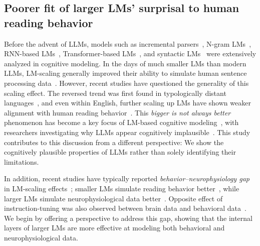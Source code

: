 \subsection{Poorer fit of larger LMs' surprisal to human reading behavior}
\label{subsec:llm_cog}
Before the advent of LLMs, models such as incremental parsers~\cite{Levy2008Expectation-basedComprehension}, N-gram LMs~\cite{Smith2013-ap}, RNN-based LMs~\cite{frank2011insensitivity,Aurnhammer2019-fu}, Transformer-based LMs~\cite{Merkx2020ComparingData}, and syntactic LMs~\cite{Hale2018FindingSearch,Yoshida2021-rc,Oh2021-ln,Oh2022-ss} were extensively analyzed in cognitive modeling. 
In the days of much smaller LMs than modern LLMs, LM-scaling generally improved their ability to simulate human sentence processing data~\cite{frank2011insensitivity,Goodkind2018PredictiveQuality,Wilcox2020OnBehavior,Wilcox2023-bb}. 
However, recent studies have questioned the generality of this scaling effect. 
The reversed trend was first found in typologically distant languages~\cite{kuribayashi-etal-2021-lower}, and even within English, further scaling up LMs have shown weaker alignment with human reading behavior~\cite{kuribayashi-etal-2022-context,Shain2022-qv,Oh2023-zw}. 
This \textit{bigger is not always better} phenomenon has become a key focus of LM-based cognitive modeling~\cite{Wilcox2024-qx}, with researchers investigating why LLMs appear cognitively implausible~\cite{kuribayashi-etal-2022-context,Oh2023-hj,Oh2023-zw,Oh2024-cc,nair2023words,kuribayashi-etal-2024-psychometric}.
This study contributes to this discussion from a different perspective: 
We show the cognitively plausible properties of LLMs rather than solely identifying their limitations. 

In addition, recent studies have typically reported 
\textit{behavior–neurophysiology gap} in LM-scaling effects~\cite{michaelov2024revenge,aw2024instructiontuning};
 smaller LMs simulate reading behavior better~\cite{Oh2023-zw}, while larger LMs simulate neurophysiological data better~\cite{Schrimpf2020-qa,michaelov2024revenge,Hosseini2024-jf}. 
Opposite effect of instruction-tuning was also observed between  brain data and behavioral data~\cite{aw2024instructiontuning,kuribayashi-etal-2024-psychometric}. 
We begin by offering a perspective to address this gap, showing that the internal layers of larger LMs are more effective at modeling both behavioral and neurophysiological data.


